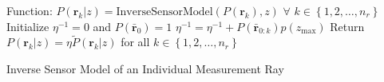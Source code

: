 \documentclass[smallextended]{svjour3}       %
\newcommand{\braces}[1]{\ensuremath{\left\{ #1 \right\}}}
\begin{document}


\begin{algorithm}[H]
	Function: $P(\mathbf{r}_k|z)=\text{InverseSensorModel}(P(\mathbf{r}_k),z)$ $\forall$ $k\in\braces{1,2,\ldots,n_{r}}$\;
	Initialize $\eta^{-1}=0$ and $P(\bar{\mathbf{r}}_{0})=1$\;
	$\eta^{-1}=\eta^{-1}+P(\bar{\mathbf{r}}_{0:k})p(z_\text{max})$\;
	Return $P(\mathbf{r}_{k}|z)=\eta\tilde P(\mathbf{r}_{k}|z)$ for all $k\in\braces{1,2,\ldots,n_{r}}$\;
\caption{Inverse Sensor Model of an Individual Measurement Ray}
\label{alg:RayByRayISM}
\end{algorithm}
\end{document}
